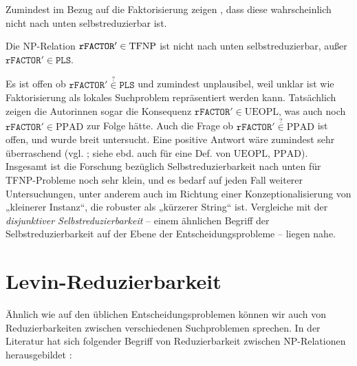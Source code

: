 Zumindest im Bezug auf die Faktorisierung zeigen \citeauthor{harsha_downward_2023}, dass diese wahrscheinlich nicht nach unten selbstreduzierbar ist.
\begin{theorem}
    Die NP-Relation $\mathtt{rFACTOR}'\in\mathrm{TFNP}$ ist nicht nach unten selbstreduzierbar, außer $\mathtt{rFACTOR}'\in\mathtt{PLS}$.
\end{theorem}
Es ist offen ob $\mathtt{rFACTOR}'\stackrel{?}{\in}\mathtt{PLS}$ und zumindest unplausibel, weil unklar ist wie Faktorisierung als lokales Suchproblem repräsentiert werden kann.
Tatsächlich zeigen die Autorinnen sogar die Konsequenz $\mathtt{rFACTOR}'\in\mathrm{UEOPL}$, was auch noch $\mathtt{rFACTOR}'\in\mathrm{PPAD}$ zur Folge hätte. Auch die Frage ob $\mathtt{rFACTOR}'\stackrel{?}{\in}\mathrm{PPAD}$ ist offen, und wurde breit untersucht. Eine positive Antwort wäre zumindest sehr überraschend (vgl. \cite[67:15]{harsha_downward_2023}; siehe ebd. auch für eine Def. von $\mathrm{UEOPL}$, $\mathrm{PPAD}$).
Insgesamt ist die Forschung bezüglich Selbstreduzierbarkeit nach unten für TFNP-Probleme noch sehr klein, und es bedarf auf jeden Fall weiterer Untersuchungen, unter anderem auch im Richtung einer Konzeptionalisierung von „kleinerer Instanz“, die robuster als „kürzerer String“ ist. Vergleiche mit der \emph{disjunktiver Selbstreduzierbarkeit} \parencites[vgl.]{balcazar_self_1989}[vgl.]{selman_natural_1988}[vgl.][Abschn. 9.5]{wechsung_vorlesungen_2000}  -- einem ähnlichen Begriff der Selbstreduzierbarkeit auf der Ebene der Entscheidungsprobleme -- liegen nahe.

\section{Levin-Reduzierbarkeit}

Ähnlich wie auf den üblichen Entscheidungsproblemen können wir auch von Reduzierbarkeiten zwischen verschiedenen Suchproblemen sprechen. In der Literatur hat sich folgender Begriff von Reduzierbarkeit zwischen NP-Relationen herausgebildet \parencites(vgl.)()[229]{papadimitriou_computational_1994}[61]{goldreich_computational_2008}[50]{arora_computational_2009}:

